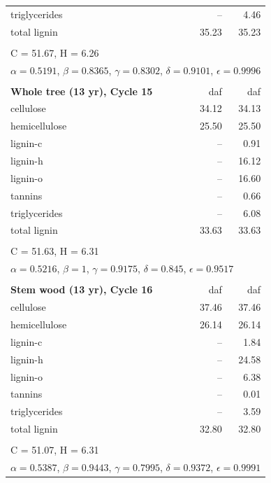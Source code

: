 \documentclass[12pt,titlepage]{article}
\begin{document}
\begin{longtable}{p{8cm}rr}
    triglycerides & --    & 4.46 \\
    total lignin  & 35.23 & 35.23 \\
    \\
    \multicolumn{3}{l}{C = 51.67, H = 6.26} \\
    \multicolumn{3}{l}{$\alpha = 0.5191$, $\beta = 0.8365$, $\gamma = 0.8302$, $\delta = 0.9101$, $\epsilon = 0.9996$} \\
    \\
    \textbf{Whole tree (13 yr), Cycle 15} & daf & daf \\
    \midrule
    cellulose     & 34.12 & 34.13 \\
    hemicellulose & 25.50 & 25.50 \\
    lignin-c      & --    & 0.91 \\
    lignin-h      & --    & 16.12 \\
    lignin-o      & --    & 16.60 \\
    tannins       & --    & 0.66 \\
    triglycerides & --    & 6.08 \\
    total lignin  & 33.63 & 33.63 \\
    \\
    \multicolumn{3}{l}{C = 51.63, H = 6.31} \\
    \multicolumn{3}{l}{$\alpha = 0.5216$, $\beta = 1$, $\gamma = 0.9175$, $\delta = 0.845$, $\epsilon = 0.9517$} \\
    \\
    \textbf{Stem wood (13 yr), Cycle 16} & daf & daf \\
    \midrule
    cellulose     & 37.46 & 37.46 \\
    hemicellulose & 26.14 & 26.14 \\
    lignin-c      & --    & 1.84 \\
    lignin-h      & --    & 24.58 \\
    lignin-o      & --    & 6.38 \\
    tannins       & --    & 0.01 \\
    triglycerides & --    & 3.59 \\
    total lignin  & 32.80 & 32.80 \\
    \\
    \multicolumn{3}{l}{C = 51.07, H = 6.31} \\
    \multicolumn{3}{l}{$\alpha = 0.5387$, $\beta = 0.9443$, $\gamma = 0.7995$, $\delta = 0.9372$, $\epsilon = 0.9991$} \\
\end{longtable}
\end{document}

